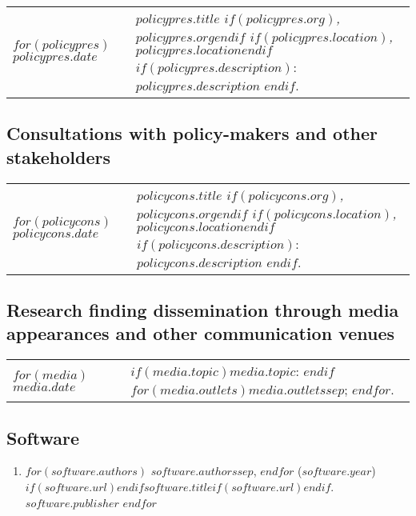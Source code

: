 \documentclass[martgin, line]{article}
\begin{document}
\setlength{\extrarowheight}{.75em}
\begin{longtable}[l]{lp{5in}}   
$for(policypres)$
$policypres.date$&
\parbox[t]{5in}{
    \textit{$policypres.title$%
    $if(policypres.org)$, $policypres.org$$endif$%
    $if(policypres.location)$, $policypres.location$$endif$}%
    $if(policypres.description)$: %
    $policypres.description$%
    $endif$.%
  }\\
$endfor$
\end{longtable}
\setlength{\extrarowheight}{0em}

\subsection*{Consultations with policy-makers and other
  stakeholders}

\setlength{\extrarowheight}{.75em}
\begin{longtable}[l]{lp{5in}}   
$for(policycons)$
$policycons.date$&
\parbox[t]{5in}{
    \textit{$policycons.title$%
    $if(policycons.org)$, $policycons.org$$endif$%
    $if(policycons.location)$, $policycons.location$$endif$}%
    $if(policycons.description)$: %
    $policycons.description$%
    $endif$.%
  }\\
$endfor$
\end{longtable}
\setlength{\extrarowheight}{0em}

\subsection*{Research finding dissemination through media appearances
  and other communication venues}


\setlength{\extrarowheight}{.75em}
\begin{longtable}[l]{lp{5in}}   
$for(media)$
$media.date$&
\parbox[t]{5in}{
    $if(media.topic)$$media.topic$: $endif$%
    $for(media.outlets)$$media.outlets$$sep$; $endfor$.%
  }\\
$endfor$
\end{longtable}
\setlength{\extrarowheight}{0em}


\subsection*{Software}

\begin{enumerate}
  $for(software)$
  \item
  $for(software.authors)$
  $software.authors$$sep$,
  $endfor$
  ($software.year$)
  $if(software.url)$\href{$software.url$}{$endif$$software.title$$if(software.url)$}$endif$.
  $software.publisher$
  $endfor$
\end{enumerate}
\end{document}
